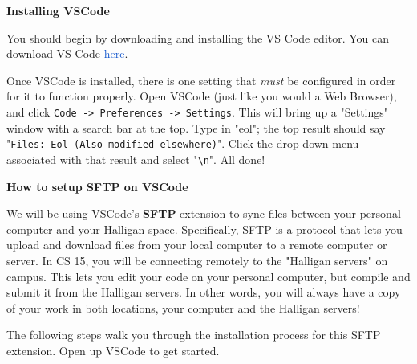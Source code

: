 \documentclass[12pt]{article}
\begin{document}
\setlength{\fboxrule}{1pt}

\vspace{1\baselineskip}
{\Large \textbf{Installing VSCode}}

\vspace{1\baselineskip}
You should begin by downloading and installing the VS Code editor. You can download VS Code \href{https://code.visualstudio.com/}{\textcolor[HTML]{1155CC}{\uline{here}}}.

\vspace{1\baselineskip}
Once VSCode is installed, there is one setting that \textit{must} be configured in order for it to function properly. Open VSCode (just like you would a Web Browser), and click \texttt{Code -> Preferences -> Settings}. This will bring up a "Settings" window with a search bar at the top. Type in "eol"; the top result should say "\texttt{Files: Eol (Also modified elsewhere)}". Click the drop-down menu associated with that result and select "\texttt{\textbackslash n}". All done!

\vspace{1\baselineskip}
{\Large \textbf{How to setup SFTP on VSCode}}

\vspace{1\baselineskip}
We will be using VSCode's \textbf{SFTP} extension to sync files between your personal computer and your Halligan space. Specifically, SFTP is a protocol that lets you upload and download files from your local computer to a remote computer or server. In CS 15, you will be connecting remotely to the "Halligan servers" on campus. This lets you edit your code on your personal computer, but compile and submit it from the Halligan servers. In other words, you will always have a copy of your work in both locations, your computer and the Halligan servers!

\vspace{1\baselineskip}
The following steps walk you through the installation process for this SFTP extension. Open up VSCode to get started.
\end{document}
